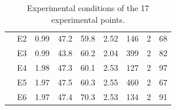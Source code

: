 \begin{table}[!ht]
\begin{tabular}{llccccccS[table-number-alignment=right, table-figures-integer = 3]}
                               & E2 &  0.99 &  47.2 &     59.8 &  2.52 &    146 &      2 &        68 \\
                               & E3 &  0.99 &  43.8 &     60.2 &  2.04 &    399 &      2 &        82 \\
                               & E4 &  1.98 &  47.3 &     60.1 &  2.53 &    127 &      2 &        97 \\
                               & E5 &  1.97 &  47.5 &     60.3 &  2.55 &    460 &      2 &        67 \\
                               & E6 &  1.97 &  47.4 &     70.3 &  2.53 &    134 &      2 &        91 \\
\end{tabular}
\caption{Experimental conditions of the 17 experimental points.\label{tab:xpplan}}
\end{table}



